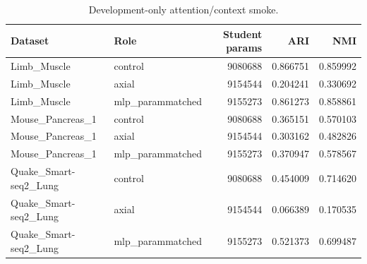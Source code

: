 \begin{table}[ht]
\centering
\caption{Development-only attention/context smoke.}
\label{tab:generated-attention-smoke}
\begin{tabular}{llrrr}
\toprule
Dataset & Role & Student params & ARI & NMI \\
\midrule
Limb\_Muscle & control & 9080688 & 0.866751 & 0.859992 \\
Limb\_Muscle & axial & 9154544 & 0.204241 & 0.330692 \\
Limb\_Muscle & mlp\_parammatched & 9155273 & 0.861273 & 0.858861 \\
Mouse\_Pancreas\_1 & control & 9080688 & 0.365151 & 0.570103 \\
Mouse\_Pancreas\_1 & axial & 9154544 & 0.303162 & 0.482826 \\
Mouse\_Pancreas\_1 & mlp\_parammatched & 9155273 & 0.370947 & 0.578567 \\
Quake\_Smart-seq2\_Lung & control & 9080688 & 0.454009 & 0.714620 \\
Quake\_Smart-seq2\_Lung & axial & 9154544 & 0.066389 & 0.170535 \\
Quake\_Smart-seq2\_Lung & mlp\_parammatched & 9155273 & 0.521373 & 0.699487 \\
\bottomrule
\end{tabular}
\end{table}

